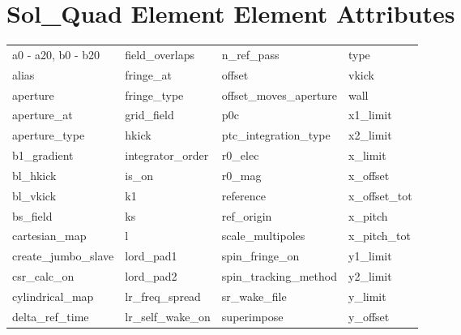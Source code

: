  \vfill
 
 \section{Sol_Quad Element Element Attributes}
 \label{s:list.sol.quad}
 
 \begin{tabular}{llll} \toprule
a0 - a20, b0 - b20          & field_overlaps              & n_ref_pass                  & type                        \\
alias                       & fringe_at                   & offset                      & vkick                       \\
aperture                    & fringe_type                 & offset_moves_aperture       & wall                        \\
aperture_at                 & grid_field                  & p0c                         & x1_limit                    \\
aperture_type               & hkick                       & ptc_integration_type        & x2_limit                    \\
b1_gradient                 & integrator_order            & r0_elec                     & x_limit                     \\
bl_hkick                    & is_on                       & r0_mag                      & x_offset                    \\
bl_vkick                    & k1                          & reference                   & x_offset_tot                \\
bs_field                    & ks                          & ref_origin                  & x_pitch                     \\
cartesian_map               & l                           & scale_multipoles            & x_pitch_tot                 \\
create_jumbo_slave          & lord_pad1                   & spin_fringe_on              & y1_limit                    \\
csr_calc_on                 & lord_pad2                   & spin_tracking_method        & y2_limit                    \\
cylindrical_map             & lr_freq_spread              & sr_wake_file                & y_limit                     \\
delta_ref_time              & lr_self_wake_on             & superimpose                 & y_offset                    \\

\end{tabular}
